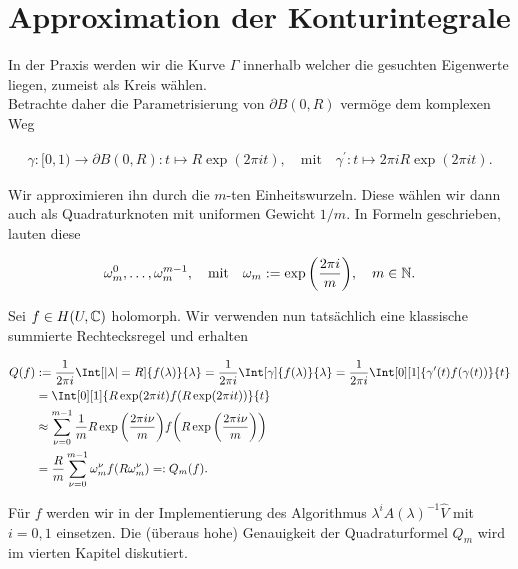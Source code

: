 \section{Approximation der Konturintegrale}

In der Praxis werden wir die Kurve $\Gamma$ innerhalb welcher
die gesuchten Eigenwerte liegen, zumeist als Kreis wählen. \\

Betrachte daher die Parametrisierung von $\partial B(0, R)$ vermöge dem komplexen Weg

\begin{align*}
    \gamma: [0, 1) \to \partial B(0, R): t \mapsto R \exp(2 \pi i t),
    \quad
    \text{mit}
    \quad
    \gamma^\prime: t \mapsto 2 \pi i R \exp(2 \pi i t).
\end{align*}

Wir approximieren ihn durch die $m$-ten Einheitswurzeln.
Diese wählen wir dann auch als Quadraturknoten mit uniformen Gewicht $1 / m$.
In Formeln geschrieben, lauten diese

\begin{align*}
    \omega_m^0, \dots, \omega_m^{m - 1},
    \quad
    \text{mit}
    \quad
    \omega_m := \exp {\left ( \frac{2 \pi i}{m} \right )},
    \quad
    m \in \mathbb{N}.
\end{align*}

Sei $f \in H(U, \mathbb{C})$ holomorph.
Wir verwenden nun tatsächlich eine klassische summierte Rechtecksregel und erhalten

\begin{align*}
    Q(f)
    & :=
    \frac{1}{2 \pi i}
    \Int[|\lambda| = R]
    {
        f(\lambda)
    }{\lambda}
    =
    \frac{1}{2 \pi i}
    \Int[\gamma]
    {
        f(\lambda)
    }{\lambda}
    =
    \frac{1}{2 \pi i}
    \Int[0][1]
    {
        \gamma^\prime(t)
        f(\gamma(t))
    }{t} \\
    & =
    \Int[0][1]
    {
        R
        \exp(2 \pi i t)
        f(R \exp(2 \pi i t))
    }{t} \\
    &\approx
    \sum_{\nu = 0}^{m-1}
        \frac{1}{m}
        R \exp \pbraces{\frac{2 \pi i \nu}{m}}
        f
        \pbraces
        {
            R \exp \pbraces{\frac{2 \pi i \nu}{m}}
        } \\
    & =
    \frac{R}{m}
    \sum_{\nu = 0}^{m-1}
        \omega_m^\nu
        f(R \omega_m^\nu)
    =:
    Q_m(f).
\end{align*}

Für $f$ werden wir in der Implementierung des Algorithmus $\lambda^i A(\lambda)^{-1} \hat V$ mit $i = 0,1$ einsetzen.
Die (überaus hohe) Genauigkeit der Quadraturformel $Q_m$ wird im vierten Kapitel diskutiert.

